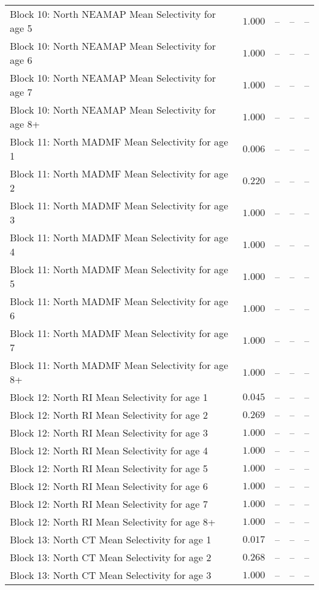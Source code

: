 \documentclass[
]{article}
\begin{document}
\begin{landscape}
\begin{longtable}[t]{lrrrr}
Block 10: North NEAMAP Mean Selectivity for age 5 & $1.000$ & -- & -- & --\\
Block 10: North NEAMAP Mean Selectivity for age 6 & $1.000$ & -- & -- & --\\
Block 10: North NEAMAP Mean Selectivity for age 7 & $1.000$ & -- & -- & --\\
\addlinespace
Block 10: North NEAMAP Mean Selectivity for age 8+ & $1.000$ & -- & -- & --\\
Block 11: North MADMF Mean Selectivity for age 1 & $0.006$ & -- & -- & --\\
Block 11: North MADMF Mean Selectivity for age 2 & $0.220$ & -- & -- & --\\
Block 11: North MADMF Mean Selectivity for age 3 & $1.000$ & -- & -- & --\\
Block 11: North MADMF Mean Selectivity for age 4 & $1.000$ & -- & -- & --\\
\addlinespace
Block 11: North MADMF Mean Selectivity for age 5 & $1.000$ & -- & -- & --\\
Block 11: North MADMF Mean Selectivity for age 6 & $1.000$ & -- & -- & --\\
Block 11: North MADMF Mean Selectivity for age 7 & $1.000$ & -- & -- & --\\
Block 11: North MADMF Mean Selectivity for age 8+ & $1.000$ & -- & -- & --\\
Block 12: North RI Mean Selectivity for age 1 & $0.045$ & -- & -- & --\\
\addlinespace
Block 12: North RI Mean Selectivity for age 2 & $0.269$ & -- & -- & --\\
Block 12: North RI Mean Selectivity for age 3 & $1.000$ & -- & -- & --\\
Block 12: North RI Mean Selectivity for age 4 & $1.000$ & -- & -- & --\\
Block 12: North RI Mean Selectivity for age 5 & $1.000$ & -- & -- & --\\
Block 12: North RI Mean Selectivity for age 6 & $1.000$ & -- & -- & --\\
\addlinespace
Block 12: North RI Mean Selectivity for age 7 & $1.000$ & -- & -- & --\\
Block 12: North RI Mean Selectivity for age 8+ & $1.000$ & -- & -- & --\\
Block 13: North CT Mean Selectivity for age 1 & $0.017$ & -- & -- & --\\
Block 13: North CT Mean Selectivity for age 2 & $0.268$ & -- & -- & --\\
Block 13: North CT Mean Selectivity for age 3 & $1.000$ & -- & -- & --\\

\end{longtable}
\end{landscape}
\end{document}
